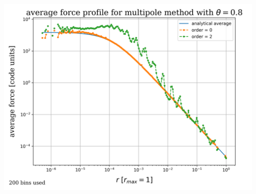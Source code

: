 \begin{frame}
\begin{columns}
			\includegraphics[width=\textwidth]{../results/multipole_forces/bucket01/0.8/multipole_forces_plot-0.8.png}
	\end{columns}
\end{frame}

